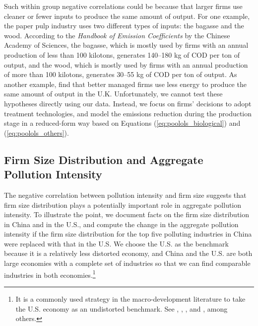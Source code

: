 \documentclass[AEJ]{AEA}
\begin{document}
Such within group negative correlations could be because that larger firms use cleaner or fewer inputs to produce the same amount of output. For one example, the paper pulp industry uses two different types of inputs: the bagasse and the wood. According to the \textit{Handbook of Emission Coefficients} by the Chinese Academy of Sciences, the bagasse, which is mostly used by firms with an annual production of less than 100 kilotons, generates 140--180 kg of COD per ton of output, and the wood, which is mostly used by firms with an annual production of more than 100 kilotons, generates 30--55 kg of COD per ton of output. %
As another example, \citet{Bloometal:2010} find that better managed firms use less energy to produce the same amount of output in the U.K. Unfortunately, we cannot test these hypotheses directly using our data. Instead, we focus on firms' decisions to adopt treatment technologies, and model the emissions reduction during the production stage in a reduced-form way based on Equations (\ref{eq:poolols_biological}) and (\ref{eq:poolols_others}).

\subsection{Firm Size Distribution and Aggregate Pollution Intensity}

The negative correlation between pollution intensity and firm size suggests that firm size distribution plays a potentially important role in aggregate pollution intensity. To illustrate the point, we document facts on the firm size distribution in China and in the U.S., and compute the change in the aggregate pollution intensity if the firm size distribution for the top five polluting industries in China were replaced with that in the U.S. We choose the U.S. as the benchmark because it is a relatively less distorted economy, and China and the U.S. are both large economies with a complete set of industries so that we can find comparable industries in both economies.\footnote{It is a commonly used strategy in the macro-development literature to take the U.S. economy as an undistorted benchmark. See \citet{Guneretal:2008}, \citet{HsiehKlenow:2009, HsiehKlenow:2014}, \citet{Bartelsmanetal:2013}, and \citet{AdamopoulosRestuccia:2014}, among others.}
\end{document}
